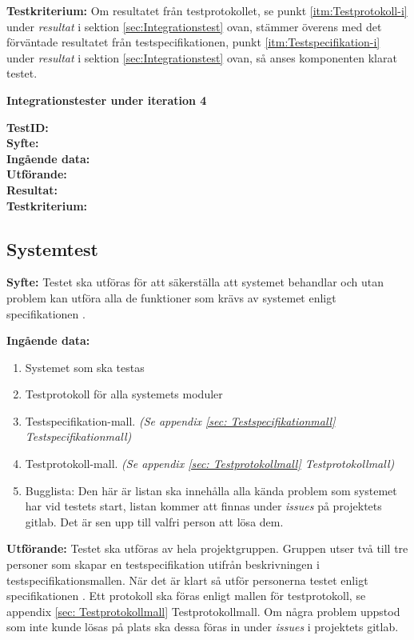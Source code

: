 \documentclass[a4paper,10pt, twoside]{article}
\begin{document}
\textbf{Testkriterium:}
Om resultatet från testprotokollet, se punkt \ref{itm:Testprotokoll-i} under \emph{resultat} i sektion \ref{sec:Integrationstest} ovan, stämmer överens med det förväntade resultatet från testspecifikationen, punkt \ref{itm:Testspecifikation-i} under \emph{resultat} i sektion \ref{sec:Integrationstest} ovan, så anses komponenten klarat testet.

\textbf{Integrationstester under iteration 4}

\textbf{TestID:}
\\ \textbf{Syfte:}
\\ \textbf{Ingående data:}
\\ \textbf{Utförande:}
\\ \textbf{Resultat:}
\\ \textbf{Testkriterium:}

\subsection{Systemtest}
\label{sec:Systemtest}
\textbf{Syfte:} Testet ska utföras för att säkerställa att systemet behandlar och utan problem kan utföra alla de funktioner som krävs av systemet enligt specifikationen \cite{kravspec}.

\textbf{Ingående data:}
\begin{enumerate}
	\item Systemet som ska testas
    \item Testprotokoll för alla systemets moduler
    \item Testspecifikation-mall. \emph{(Se appendix \ref{sec: Testspecifikationmall} Testspecifikationmall)}
    \item Testprotokoll-mall. \emph{(Se appendix \ref{sec: Testprotokollmall} Testprotokollmall)}
    \item Bugglista: Den här är listan ska innehålla alla kända problem som systemet har vid testets start, listan kommer att finnas under \emph{issues} på 	 projektets gitlab. Det är sen upp till valfri person att lösa dem.
\end{enumerate}

\textbf{Utförande:} Testet ska utföras av hela projektgruppen. Gruppen utser två till tre personer som skapar en testspecifikation utifrån beskrivningen i
testspecifikationsmallen. När det är klart så utför personerna testet enligt specifikationen \cite{kravspec}. Ett protokoll ska föras enligt mallen för
testprotokoll, se appendix \ref{sec: Testprotokollmall} Testprotokollmall. Om några problem uppstod som inte kunde lösas på plats ska dessa föras in under \emph{issues} i projektets gitlab.
\end{document}
